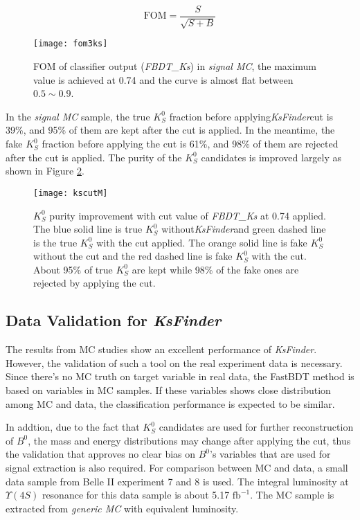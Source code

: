 \begin{equation}\label{eq:fom}
	\text{FOM} = \frac{S}{\sqrt{S+B}}
\end{equation}

\begin{figure}[H]
	\centering
	\texttt{[image: fom3ks]}
	\caption{FOM of classifier output (\textit{FBDT\_Ks}) in \textit{signal MC}, the maximum value is achieved at 0.74 and the curve is almost flat between $0.5\sim 0.9$.}
	\label{fig:ks_fom}
\end{figure}

In the \textit{signal MC} sample, the true $K_S^0$ fraction before applying\textit{KsFinder}cut is 39\%, and 95\% of them are kept after the cut is applied. In the meantime, the fake $K_S^0$ fraction before applying the cut is 61\%, and 98\% of them are rejected after the cut is applied. The purity of the $K_S^0$ candidates is improved largely as shown in Figure \ref{fig:ks_cutused}.

\begin{figure}[htpb]
	\centering
	\texttt{[image: kscutM]}
	\caption{$K_S^0$ purity improvement with cut value of \textit{FBDT\_Ks} at 0.74 applied. The blue solid line is true $K_S^0$ without\textit{KsFinder}and green dashed line is the true $K_S^0$ with the cut applied. The orange solid line is fake $K_S^0$ without the cut and the red dashed line is fake $K_S^0$ with the cut. About 95\% of true $K_S^0$ are kept while 98\% of the fake ones are rejected by applying the cut.}
	\label{fig:ks_cutused}
\end{figure}

\subsection{Data Validation for \textit{KsFinder}}
The results from MC studies show an excellent performance of \textit{KsFinder}. However, the validation of such a tool on the real experiment data is necessary. Since there's no MC truth on target variable in real data, the FastBDT method is based on variables in MC samples. If these variables shows close distribution among MC and data, the classification performance is expected to be similar.

In addtion, due to the fact that $K_S^0$ candidates are used for further reconstruction of $B^0$, the  mass and energy distributions may change after applying the cut, thus the validation that approves no clear bias on $B^0$'s variables that are used for signal extraction is also required. For comparison between MC and data, a small data sample from Belle II  experiment 7 and 8 is used. The integral luminosity at $\Upsilon(4S)$ resonance for this data sample is about 5.17 $\text{fb}^{-1}$. The MC sample is extracted from \textit{generic MC} with equivalent luminosity.


